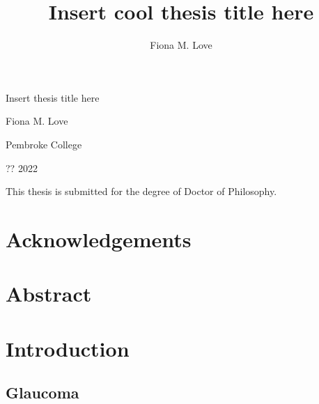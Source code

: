 \documentclass[
]{book}
\title{Insert cool thesis title here}
\author{Fiona M. Love}
\date{}
\begin{document}
\maketitle

\begin{titlepage}
\begin{center}

  \hspace{0pt}
  \vfill
  
  {\Huge
  Insert thesis title here
  }\par
  
  {\Large
  Fiona M. Love
  }\par
  
   \vspace{1\baselineskip}
  
  {Pembroke College}\par
  {?? 2022}\par
  
  \vspace{4\baselineskip}
  
  {This thesis is submitted for the degree of Doctor of Philosophy.}\par
  
  \vfill
  \hspace{0pt}

\end{center}
\end{titlepage}

{
\setcounter{tocdepth}{1}
\tableofcontents
}
\hypertarget{acknowledgements}{%
\chapter*{Acknowledgements}\label{acknowledgements}}

\hypertarget{abstract}{%
\chapter*{Abstract}\label{abstract}}

\tableofcontents

\hypertarget{introduction}{%
\chapter*{Introduction}\label{introduction}}

\hypertarget{glaucoma}{%
\section{Glaucoma}\label{glaucoma}}
\end{document}

